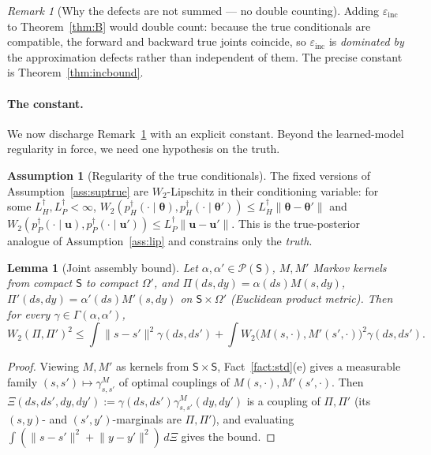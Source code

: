 \documentclass[11pt]{article}
\theoremstyle{plain}
\newtheorem{lemma}[theorem]{Lemma}
\theoremstyle{definition}
\newtheorem{assumption}{Assumption}
\theoremstyle{remark}
\newtheorem{remark}{Remark}
\newcommand{\cP}{\mathcal{P}}
\newcommand{\Om}{\Omega}
\newcommand{\bth}{\bm{\theta}}
\newcommand{\bu}{\bm{u}}
\newcommand{\norm}[1]{\lVert #1 \rVert}
\newcommand{\einc}{\varepsilon_{\mathrm{inc}}}
\begin{document}
\begin{remark}[Why the defects are not summed --- no double counting]
\label{rem:nodouble}
Adding $\einc$ to Theorem~\ref{thm:B} would double count: because the true conditionals are compatible,
the forward and backward true joints coincide, so $\einc$ is \emph{dominated by} the approximation
defects rather than independent of them. The precise constant is Theorem~\ref{thm:incbound}.
\end{remark}

\paragraph{The constant.} We now discharge Remark~\ref{rem:nodouble} with an explicit constant. Beyond
the learned-model regularity in force, we need one hypothesis on the truth.

\begin{assumption}[Regularity of the true conditionals]
\label{ass:truereg}
The fixed versions of Assumption~\ref{ass:suptrue} are $W_2$-Lipschitz in their conditioning variable:
for some $L_H^\dagger,L_P^\dagger<\infty$,
$W_2(p^\dagger_H(\cdot\mid\bth),p^\dagger_H(\cdot\mid\bth'))\le L_H^\dagger\norm{\bth-\bth'}$ and
$W_2(p^\dagger_P(\cdot\mid\bu),p^\dagger_P(\cdot\mid\bu'))\le L_P^\dagger\norm{\bu-\bu'}$. This is the
true-posterior analogue of Assumption~\ref{ass:lip} and constrains only the \emph{truth}.
\end{assumption}

\begin{lemma}[Joint assembly bound]
\label{lem:assembly}
Let $\alpha,\alpha'\in\cP(\mathsf S)$, $M,M'$ Markov kernels from compact $\mathsf S$ to compact
$\Om'$, and $\Pi(ds,dy)=\alpha(ds)M(s,dy)$, $\Pi'(ds,dy)=\alpha'(ds)M'(s,dy)$ on $\mathsf S\times\Om'$
(Euclidean product metric). Then for \emph{every} $\gamma\in\Gamma(\alpha,\alpha')$,
\[
  W_2(\Pi,\Pi')^2\le\int\norm{s-s'}^2\gamma(ds,ds')+\int W_2\big(M(s,\cdot),M'(s',\cdot)\big)^2\gamma(ds,ds').
\]
\end{lemma}
\begin{proof}
Viewing $M,M'$ as kernels from $\mathsf S\times\mathsf S$, Fact~\ref{fact:std}(e) gives a measurable
family $(s,s')\mapsto\gamma^M_{s,s'}$ of optimal couplings of $M(s,\cdot),M'(s',\cdot)$. Then
$\Xi(ds,ds',dy,dy'):=\gamma(ds,ds')\gamma^M_{s,s'}(dy,dy')$ is a coupling of $\Pi,\Pi'$ (its $(s,y)$-
and $(s',y')$-marginals are $\Pi,\Pi'$), and evaluating $\int(\norm{s-s'}^2+\norm{y-y'}^2)\,d\Xi$ gives
the bound.
\end{proof}
\end{document}
